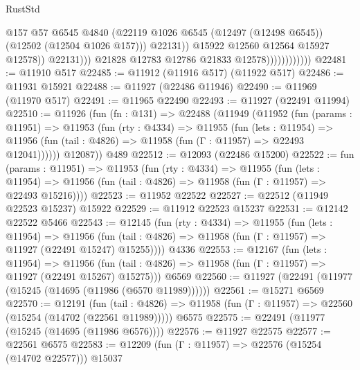 \begin{lexlean}{RustStd}
\begin{coremodule}
                                          @157
                                          @57
                                          @6545
                                          @4840
                                          (@22119
                                            @1026
                                            @6545
                                            (@12497 (@12498 @6545))
                                            (@12502 (@12504 @1026 @157)))
                                          @22131))
                                      @15922
                                      @12560
                                      @12564
                                      @15927
                                      @12578))
                                  @22131)))
                            @21828
                            @12783
                            @12786
                            @21833
                            @12578))))))))))))
@22481 := @11910 @517
@22485 := @11912 (@11916 @517) (@11922 @517)
@22486 := @11931 @15921
@22488 := @11927 (@22486 @11946)
@22490 := @11969 (@11970 @517)
@22491 := @11965 @22490
@22493 := @11927 (@22491 @11994)
@22510 := @11926
    (fun (fn : @131) =>
    @22488
      (@11949
        (@11952
          (fun (params : @11951) =>
          @11953
            (fun (rty : @4334) =>
            @11955
              (fun (lets : @11954) =>
              @11956 (fun (tail : @4826) => @11958 (fun (Γ : @11957) => @22493 @12041))))))
        @12087))
    @489
@22512 := @12093 (@22486 @15200)
@22522 := fun (params : @11951) =>
  @11953
    (fun (rty : @4334) =>
    @11955
      (fun (lets : @11954) =>
      @11956 (fun (tail : @4826) => @11958 (fun (Γ : @11957) => @22493 @15216))))
@22523 := @11952 @22522
@22527 := @22512 (@11949 @22523 @15237) @15922
@22529 := @11912 @22523 @15237
@22531 := @12142 @22522 @5466
@22543 := @12145
    (fun (rty : @4334) =>
    @11955
      (fun (lets : @11954) =>
      @11956 (fun (tail : @4826) => @11958 (fun (Γ : @11957) => @11927 (@22491 @15247) @15255))))
    @4336
@22553 := @12167
    (fun (lets : @11954) =>
    @11956 (fun (tail : @4826) => @11958 (fun (Γ : @11957) => @11927 (@22491 @15267) @15275)))
    @6569
@22560 := @11927 (@22491 (@11977 (@15245 (@14695 (@11986 (@6570 @11989))))))
@22561 := @15271 @6569
@22570 := @12191
    (fun (tail : @4826) => @11958 (fun (Γ : @11957) => @22560 (@15254 (@14702 (@22561 @11989)))))
    @6575
@22575 := @22491 (@11977 (@15245 (@14695 (@11986 @6576))))
@22576 := @11927 @22575
@22577 := @22561 @6575
@22583 := @12209 (fun (Γ : @11957) => @22576 (@15254 (@14702 @22577))) @15037

\end{coremodule}
\end{lexlean}
